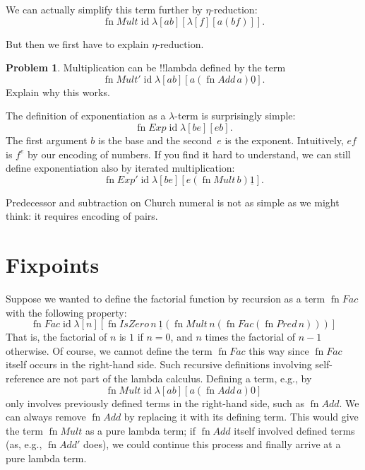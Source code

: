 \documentclass[10pt,a4paper]{article}
\theoremstyle{plain}
\theoremstyle{definition}
\newtheorem{prob}{Problem}[section]
\theoremstyle{remark}
\newenvironment{editorial}{}{}
\newcommand*{\olfileid}[3]{}
\newcommand*{\olsection}[1]{\section*{#1}}
\providecommand{\num}[1]{\underline{#1}}
\providecommand{\lambd}{\ensuremath{\lambda}}
\providecommand{\ident}{\operatorname{id}}
\providecommand{\fn}{\operatorname{fn}}
\providecommand{\fn}{\operatorname{fn}}
\begin{document}
\begin{editorial}
We can actually simplify this term further by $\eta$-reduction:
\[
  \fn{Mult} \ident \lambd[ab][\lambd[f][a (b f)]].
\]

But then we first have to explain $\eta$-reduction.
\end{editorial}

\begin{prob}
Multiplication can be !!{lambda define}d by the term
\[
  \fn{Mult}' \ident \lambd[ab][a (\fn{Add}\, a) \num{0}].
\]
Explain why this works.
\end{prob}

The definition of exponentiation as a $\lambd$-term is
surprisingly simple:
\[
  \fn{Exp} \ident \lambd[be][e b].
\]
The first argument $b$ is the base and the second~$e$ is the exponent.
Intuitively, $e f$ is $f^e$ by our encoding of numbers. If you find it
hard to understand, we can still define exponentiation also by
iterated multiplication:
\[
  \fn{Exp}' \ident \lambd[be][e (\fn{Mult}\, b) \num{1}].
\]

Predecessor and subtraction on Church numeral is not as simple as we
might think: it requires encoding of pairs.





\olfileid{lam}{ldf}{fp}

\olsection{Fixpoints}

Suppose we wanted to define the factorial function by recursion as a
term $\fn{Fac}$ with the following property:
\[
\fn{Fac} \ident \lambd[n][\fn{IsZero}\, n\, \num 1 (\fn{Mult}\, n (\fn{Fac}(\fn{Pred} \, n)))]
\]
That is, the factorial of $n$ is $1$ if $n = 0$, and $n$ times the
factorial of $n-1$ otherwise.  Of course, we cannot define the term
$\fn{Fac}$ this way since $\fn{Fac}$ itself occurs in the right-hand
side. Such recursive definitions involving self-reference
are not part of the lambda calculus. Defining a term, e.g., by
\[
\fn{Mult} \ident \lambd[ab][a (\fn{Add}\, a) 0]
\]
only involves previously defined terms in the right-hand side, such as
$\fn{Add}$. We can always remove $\fn{Add}$ by replacing it with its
defining term.  This would give the term $\fn{Mult}$ as a pure lambda
term; if $\fn{Add}$ itself involved defined terms (as, e.g.,
$\fn{Add}'$ does), we could continue this process and finally arrive at
a pure lambda term.
\end{document}

